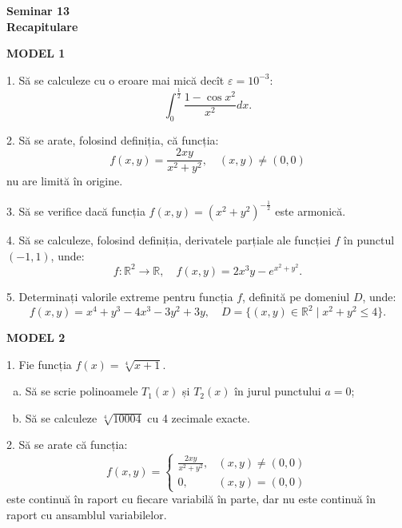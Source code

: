 \documentclass[11pt,a4paper]{article}
\newcommand\RR{\mathbb{R}}
\theoremstyle{dotless}
\theoremstyle{dotlessdr}
\begin{document}
\begin{center}
  {\large\textbf{Seminar 13 \\ Recapitulare}}
\end{center}

\textbf{MODEL 1}

1. Să se calculeze cu o eroare mai mică decît $\varepsilon = 10^{-3}$:
\[
  \int_0^{\frac{1}{2}} \frac{1 - \cos x^2}{x^2} dx.
\]

\vspace{1cm}

2. Să se arate, folosind definiția, că funcția:
\[
  f(x, y) = \frac{2xy}{x^2 + y^2}, \quad (x, y) \neq (0, 0)
\]
nu are limită în origine.

\vspace{1cm}

3. Să se verifice dacă funcția $f(x, y) = (x^2 + y^2)^{-\frac{1}{2}}$ este
armonică.

\vspace{1cm}

4. Să se calculeze, folosind definiția, derivatele parțiale ale funcției $f$
în punctul $(-1, 1)$, unde:
\[
  f : \RR^2 \to \RR, \quad f(x, y) = 2x^3y - e^{x^2 + y^2}.
\]

\vspace{1cm}

5. Determinați valorile extreme pentru funcția $f$, definită pe domeniul
$D$, unde:
\[
  f(x, y) = x^4 + y^3 - 4x^3 - 3y^2 + 3y, \quad D = \{(x, y) \in \RR^2 \mid x^2 + y^2 \leq 4 \}.
\]

\vspace{2cm}

\textbf{MODEL 2}

1. Fie funcția $f(x) = \sqrt[4]{x + 1}$.
\begin{enumerate}[(a)]
\item Să se scrie polinoamele $T_1(x)$ și $T_2(x)$ în jurul punctului $a = 0$;
\item Să se calculeze $\sqrt[4]{10004}$ cu 4 zecimale exacte.
\end{enumerate}

\vspace{1cm}

2. Să se arate că funcția:
\[
  f(x, y) = \begin{cases}
    \frac{2xy}{x^2 + y^2}, & (x, y) \neq (0, 0) \\
    0, & (x, y) = (0, 0)
  \end{cases}
\]
este continuă în raport cu fiecare variabilă în parte, dar nu este continuă în raport
cu ansamblul variabilelor.
\end{document}

